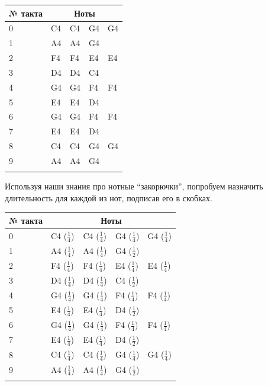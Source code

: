 \documentclass[a4paper,twoside]{book}
\begin{document}
\begin{tabular}{p{2cm}|p{2cm}|p{2cm}|p{2cm}|p{2cm}}
  № такта & \multicolumn{4}{c}{Ноты} \\
  \hline \hline
  0 & C4 & C4 & G4 & G4 \\
  \hline
  1 & A4 & A4 & G4 & \\
  \hline
  2 & F4 & F4 & E4 & E4 \\
  \hline
  3 & D4 & D4 & C4 & \\
  \hline
  4 & G4 & G4 & F4 & F4 \\
  \hline
  5 & E4 & E4 & D4 & \\
  \hline
  6 & G4 & G4 & F4 & F4 \\
  \hline
  7 & E4 & E4 & D4 & \\
  \hline
  8 & C4 & C4 & G4 & G4 \\
  \hline
  9 & A4 & A4 & G4 & \\
  \hline
  \label{table:twinkle-twinkle-little-star-notes}
\end{tabular}

Используя наши знания про нотные ``закорючки'', попробуем назначить длительность
для каждой из нот, подписав его в скобках.

\begin{tabular}{p{2cm}|p{2cm}|p{2cm}|p{2cm}|p{2cm}}
  № такта & \multicolumn{4}{c}{Ноты} \\
  \hline \hline
  0 & C4 ($\frac{1}{4}$) & C4 ($\frac{1}{4}$) & G4 ($\frac{1}{4}$) & G4 ($\frac{1}{4}$) \\
  \hline
  1 & A4 ($\frac{1}{4}$) & A4 ($\frac{1}{4}$) & G4 ($\frac{1}{2}$) & \\
  \hline
  2 & F4 ($\frac{1}{4}$) & F4 ($\frac{1}{4}$) & E4 ($\frac{1}{4}$) & E4 ($\frac{1}{4}$) \\
  \hline
  3 & D4 ($\frac{1}{4}$) & D4 ($\frac{1}{4}$) & C4 ($\frac{1}{2}$) & \\
  \hline
  4 & G4 ($\frac{1}{4}$) & G4 ($\frac{1}{4}$) & F4 ($\frac{1}{4}$) & F4 ($\frac{1}{4}$) \\
  \hline
  5 & E4 ($\frac{1}{4}$) & E4 ($\frac{1}{4}$) & D4 ($\frac{1}{2}$) & \\
  \hline
  6 & G4 ($\frac{1}{4}$) & G4 ($\frac{1}{4}$) & F4 ($\frac{1}{4}$) & F4 ($\frac{1}{4}$) \\
  \hline
  7 & E4 ($\frac{1}{4}$) & E4 ($\frac{1}{4}$) & D4 ($\frac{1}{2}$) & \\
  \hline
  8 & C4 ($\frac{1}{4}$) & C4 ($\frac{1}{4}$) & G4 ($\frac{1}{4}$) & G4 ($\frac{1}{4}$) \\
  \hline
  9 & A4 ($\frac{1}{4}$) & A4 ($\frac{1}{4}$) & G4 ($\frac{1}{2}$) & \\
  \hline
  \label{table:twinkle-twinkle-little-star-notes}
\end{tabular}
\end{document}

